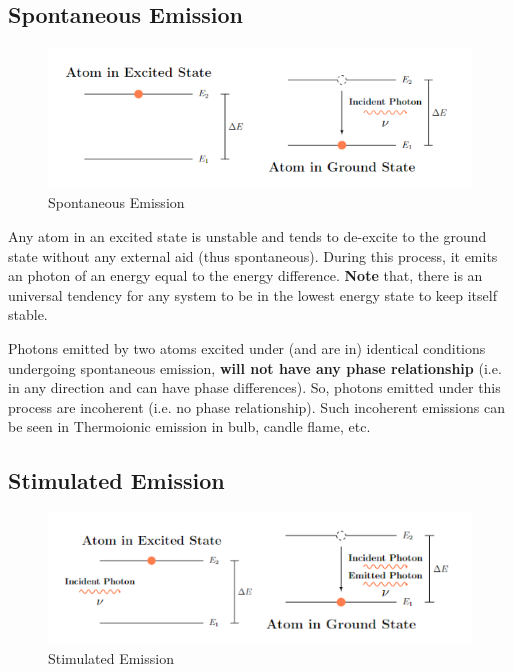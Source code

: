 \documentclass[12pt]{article}
\begin{document}
\subsection{Spontaneous Emission}

\begin{figure}[H]
    \centering
    \includegraphics[scale=0.8]{./img/04_spontaneous_emission.png}
    \caption{Spontaneous Emission}
\end{figure}

Any atom in an excited state is unstable and tends to de-excite to the ground state without any external aid (thus spontaneous). During this process, it emits an photon of an energy equal to the energy difference. \textbf{Note} that, there is an universal tendency for any system to be in the lowest energy state to keep itself stable.

Photons emitted by two atoms excited under (and are in) identical conditions undergoing spontaneous emission, \textbf{will not have any phase relationship} (i.e. in any direction and can have phase differences). So, photons emitted under this process are incoherent (i.e. no phase relationship). Such incoherent emissions can be seen in Thermoionic emission in bulb, candle flame, etc.

\subsection{Stimulated Emission}

\begin{figure}[H]
    \centering
    \includegraphics[scale=0.8]{./img/05_stimulated_emission.png}
    \caption{Stimulated Emission}
\end{figure}
\end{document}
